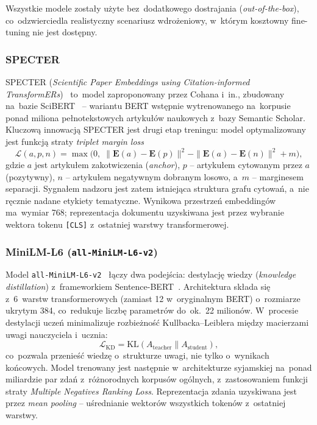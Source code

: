Wszystkie modele zostały użyte bez~dodatkowego dostrajania (\textit{out-of-the-box}),
co~odzwierciedla realistyczny scenariusz wdrożeniowy, w~którym kosztowny
fine-tuning nie jest dostępny.

\subsubsection{SPECTER}

SPECTER (\textit{Scientific Paper Embeddings using Citation-informed
TransformERs})~\cite{specter2020} to~model zaproponowany przez Cohana i~in.,
zbudowany na~bazie SciBERT~\cite{scibert2019} -- wariantu BERT
wstępnie wytrenowanego na~korpusie ponad miliona pełnotekstowych artykułów
naukowych z~bazy Semantic Scholar.
Kluczową innowacją SPECTER jest drugi etap treningu: model optymalizowany jest
funkcją straty \textit{triplet margin loss}
\begin{equation}
    \mathcal{L}(a,p,n) = \max\bigl(0,\;
        \|\mathbf{E}(a) - \mathbf{E}(p)\|^2 -
        \|\mathbf{E}(a) - \mathbf{E}(n)\|^2 + m\bigr),
\end{equation}
gdzie $a$ jest artykułem zakotwiczenia (\textit{anchor}),
$p$ -- artykułem cytowanym przez $a$ (pozytywny),
$n$ -- artykułem negatywnym dobranym losowo,
a~$m$ -- marginesem separacji.
Sygnałem nadzoru jest zatem istniejąca struktura grafu cytowań,
a~nie ręcznie nadane etykiety tematyczne.
Wynikowa przestrzeń embeddingów ma~wymiar 768;
reprezentacja dokumentu uzyskiwana jest przez wybranie wektora
tokenu \texttt{[CLS]} z~ostatniej warstwy transformerowej.

\subsubsection{MiniLM-L6 (\texttt{all-MiniLM-L6-v2})}

Model \texttt{all-MiniLM-L6-v2}~\cite{wang2020minilm} łączy dwa podejścia:
destylację wiedzy (\textit{knowledge distillation}) z~frameworkiem
Sentence-BERT~\cite{sbert2019}.
Architektura składa się z~6~warstw transformerowych
(zamiast 12 w~oryginalnym BERT) o~rozmiarze ukrytym 384,
co~redukuje liczbę parametrów do~ok.~22 milionów.
W~procesie destylacji uczeń minimalizuje rozbieżność Kullbacka--Leiblera
między macierzami uwagi nauczyciela i~ucznia:
\begin{equation}
    \mathcal{L}_{\mathrm{KD}} = \mathrm{KL}(A_{\mathrm{teacher}} \| A_{\mathrm{student}}),
\end{equation}
co~pozwala przenieść wiedzę o~strukturze uwagi, nie tylko o~wynikach końcowych.
Model trenowany jest następnie w~architekturze syjamskiej
na~ponad miliardzie par zdań z~różnorodnych korpusów ogólnych,
z~zastosowaniem funkcji straty \textit{Multiple Negatives Ranking Loss}.
Reprezentacja zdania uzyskiwana jest przez \textit{mean pooling}
-- uśrednianie wektorów wszystkich tokenów z~ostatniej warstwy.

